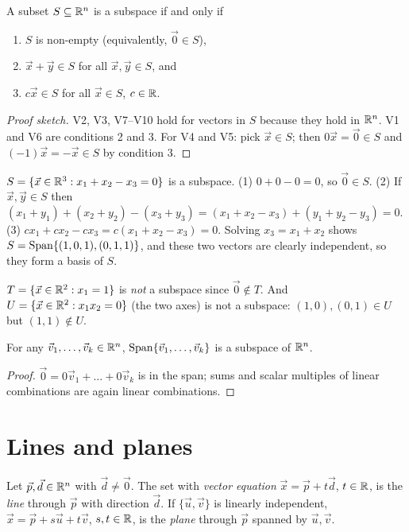 \begin{theorem}
A subset $S\subseteq\mathbb{R}^n$ is a subspace if and only if
\begin{enumerate}
  \item $S$ is non-empty (equivalently, $\vec 0\in S$),
  \item $\vec x+\vec y\in S$ for all $\vec x,\vec y\in S$, and
  \item $c\vec x\in S$ for all $\vec x\in S$, $c\in\mathbb{R}$.
\end{enumerate}
\end{theorem}
\begin{proof}[Proof sketch]
V2, V3, V7--V10 hold for vectors in $S$ because they hold in $\mathbb{R}^n$. V1 and V6 are
conditions 2 and 3. For V4 and V5: pick $\vec x\in S$; then $0\vec x=\vec 0\in S$ and
$(-1)\vec x=-\vec x\in S$ by condition 3.
\end{proof}

\begin{example}
$S=\{\vec x\in\mathbb{R}^3 : x_1+x_2-x_3=0\}$ is a subspace. (1) $0+0-0=0$, so $\vec 0\in S$.
(2) If $\vec x,\vec y\in S$ then $(x_1+y_1)+(x_2+y_2)-(x_3+y_3) = (x_1+x_2-x_3)+(y_1+y_2-y_3)=0$.
(3) $cx_1+cx_2-cx_3=c(x_1+x_2-x_3)=0$. Solving $x_3=x_1+x_2$ shows
$S=\operatorname{Span}\{(1,0,1),(0,1,1)\}$, and these two vectors are clearly independent, so they form a
basis of $S$.
\end{example}

\begin{example}
$T=\{\vec x\in\mathbb{R}^2 : x_1=1\}$ is \emph{not} a subspace since $\vec 0\notin T$. And
$U=\{\vec x\in\mathbb{R}^2 : x_1x_2=0\}$ (the two axes) is not a subspace: $(1,0),(0,1)\in U$ but
$(1,1)\notin U$.
\end{example}

\begin{theorem}
For any $\vec v_1,\dots,\vec v_k\in\mathbb{R}^n$, $\operatorname{Span}\{\vec v_1,\dots,\vec v_k\}$ is a subspace of $\mathbb{R}^n$.
\end{theorem}
\begin{proof}
$\vec 0 = 0\vec v_1+\dots+0\vec v_k$ is in the span; sums and scalar multiples of linear
combinations are again linear combinations.
\end{proof}

\section{Lines and planes}

\begin{definition}
Let $\vec p,\vec d\in\mathbb{R}^n$ with $\vec d\neq\vec 0$. The set with \emph{vector equation}
$\vec x = \vec p + t\vec d$, $t\in\mathbb{R}$, is the \emph{line} through $\vec p$ with direction
$\vec d$. If $\{\vec u,\vec v\}$ is linearly independent, $\vec x=\vec p+s\vec u+t\vec v$,
$s,t\in\mathbb{R}$, is the \emph{plane} through $\vec p$ spanned by $\vec u,\vec v$.
\end{definition}

